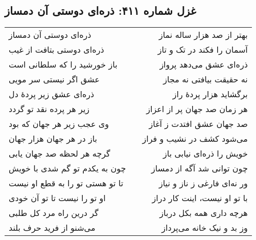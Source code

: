 \begin{center}
\section*{غزل شماره ۴۱۱: ذره‌ای دوستی آن دمساز}
\label{sec:411}
\begin{longtable}{l p{0.5cm} r}
ذره‌ای دوستی آن دمساز
&&
بهتر از صد هزار ساله نماز
\\
ذره‌ای دوستی بتافت از غیب
&&
آسمان را فکند در تک و تاز
\\
باز خورشید را که سلطانی است
&&
ذره‌ای عشق می‌دهد پرواز
\\
عشق اگر نیستی سر مویی
&&
نه حقیقت بیافتی نه مجاز
\\
ذره‌ای عشق زیر پردهٔ دل
&&
برگشاید هزار پردهٔ راز
\\
زیر هر پرده نقد تو گردد
&&
هر زمان صد جهان پر از اعزاز
\\
وی عجب زیر هر جهان که بود
&&
صد جهان عشق افتدت ز آغاز
\\
باز در هر جهان هزار جهان
&&
می‌شود کشف در نشیب و فراز
\\
گرچه هر لحظه صد جهان یابی
&&
خویش را ذره‌ای نیابی باز
\\
چون به یکدم تو گم شدی با خویش
&&
چون توانی شد آگه از دمساز
\\
تا تو هستی تو را به قطع او نیست
&&
ور نه‌ای فارغی ز ناز و نیاز
\\
او تو را نیست تا تو آن خودی
&&
با تو او نیست، اینت کار دراز
\\
گر درین راه مرد کل طلبی
&&
هرچه داری همه بکل درباز
\\
می‌شنو از فرید حرف بلند
&&
وز بد و نیک خانه می‌پرداز
\\
\end{longtable}
\end{center}
